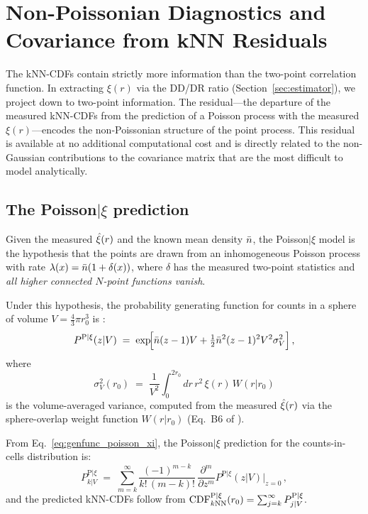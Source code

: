 \section{Non-Poissonian Diagnostics and Covariance from kNN Residuals}
\label{sec:nonpoisson}

The kNN-CDFs contain strictly more information than the two-point correlation function.  In extracting $\xi(r)$ via the DD/DR ratio (Section~\ref{sec:estimator}), we project down to two-point information.  The residual---the departure of the measured kNN-CDFs from the prediction of a Poisson process with the measured $\xi(r)$---encodes the non-Poissonian structure of the point process.  This residual is available at no additional computational cost and is directly related to the non-Gaussian contributions to the covariance matrix that are the most difficult to model analytically.

\subsection{The Poisson$|\xi$ prediction}
\label{sec:poisson_prediction}

Given the measured $\hat{\xi}(r)$ and the known mean density $\bar{n}$, the Poisson$|\xi$ model is the hypothesis that the points are drawn from an inhomogeneous Poisson process with rate $\lambda(x) = \bar{n}(1 + \delta(x))$, where $\delta$ has the measured two-point statistics and \emph{all higher connected $N$-point functions vanish}.

Under this hypothesis, the probability generating function for counts in a sphere of volume $V = \frac{4}{3}\pi r_0^3$ is \citep{Banerjee2020}:
\begin{equation}
  P^{\mathrm{P}|\xi}(z|V) \;=\; \exp\!\Bigl[\bar{n}(z-1)V + \tfrac{1}{2}\bar{n}^2(z-1)^2 V^2 \sigma_V^2\Bigr]\,,
  \label{eq:genfunc_poisson_xi}
\end{equation}
where
\begin{equation}
  \sigma_V^2(r_0) \;=\; \frac{1}{V^2}\int_0^{2r_0} dr\,r^2\,\xi(r)\,W(r|r_0)
  \label{eq:sigmaV_xi}
\end{equation}
is the volume-averaged variance, computed from the measured $\hat{\xi}(r)$ via the sphere-overlap weight function $W(r|r_0)$ (Eq.~B6 of \citealt{Banerjee2020}).

From Eq.~\eqref{eq:genfunc_poisson_xi}, the Poisson$|\xi$ prediction for the counts-in-cells distribution is:
\begin{equation}
  P^{\mathrm{P}|\xi}_{k|V} \;=\; \sum_{m=k}^{\infty} \frac{(-1)^{m-k}}{k!\,(m-k)!}\,\frac{\partial^m}{\partial z^m} P^{\mathrm{P}|\xi}(z|V)\Bigg|_{z=0}\,,
  \label{eq:Pk_prediction}
\end{equation}
and the predicted kNN-CDFs follow from $\mathrm{CDF}^{\mathrm{P}|\xi}_{k\mathrm{NN}}(r_0) = \sum_{j=k}^{\infty} P^{\mathrm{P}|\xi}_{j|V}$.

